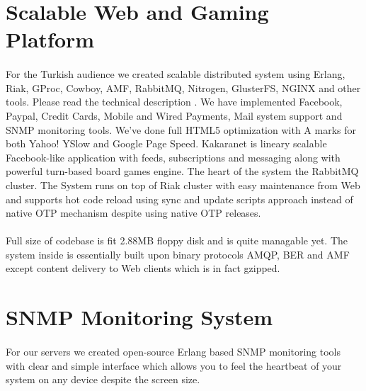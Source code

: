 \documentclass[11pt]{article}
\begin{document}
\section*{Scalable Web and Gaming Platform}
\paragraph{}
    For the Turkish audience we created scalable distributed system using Erlang, Riak,
    GProc, Cowboy, AMF, RabbitMQ, Nitrogen, GlusterFS, NGINX and other tools. 
    Please read the technical description
    .
    We have implemented Facebook, Paypal, Credit Cards, Mobile and Wired Payments,
    Mail system support and SNMP monitoring tools. We've done full HTML5 optimization
    with A marks for both Yahoo! YSlow and Google Page Speed. Kakaranet is lineary scalable
    Facebook-like application with feeds, subscriptions and messaging along with
    powerful turn-based board games engine. The heart of the system the RabbitMQ
    cluster. The System runs on top of Riak cluster with easy maintenance from Web
    and supports hot code reload using sync and update scripts approach 
    instead of native OTP mechanism despite using native OTP releases. 



\paragraph{}
    Full size of codebase is fit 2.88MB floppy disk and is quite managable yet.
    The system inside is essentially built upon binary protocols AMQP, BER and AMF
    except content delivery to Web clients which is in fact gzipped.



\section*{SNMP Monitoring System}
\paragraph{}
    For our servers we created open-source Erlang based SNMP monitoring tools
    with clear and simple interface which allows you to feel the heartbeat of
    your system on any device despite the screen size.
\end{document}
